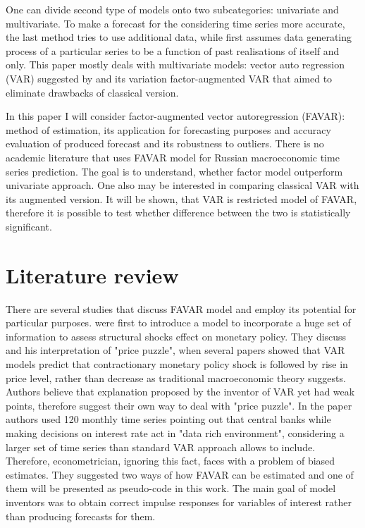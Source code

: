\documentclass[a4paper, 14pt]{article}
\begin{document}
One can divide second type of models onto two subcategories: univariate and multivariate. To make a forecast for the considering time series more accurate, the last method tries to use additional data, while first assumes data generating process of a particular series to be a function of past realisations of itself and only. This paper mostly deals with multivariate models: vector auto regression (VAR) suggested by \cite{sims1980martingale} and its variation factor-augmented VAR that aimed to eliminate drawbacks of classical version.  

In this paper I will consider factor-augmented vector autoregression (FAVAR): method of estimation, its application for forecasting purposes and accuracy evaluation of produced forecast and its robustness to outliers. There is no academic literature that uses FAVAR model for Russian macroeconomic time series prediction. The goal is to understand, whether factor model outperform univariate approach. One also may be interested in comparing classical VAR with its augmented version. It will be shown, that VAR is restricted model of FAVAR, therefore it is possible to test whether difference between the two is statistically significant. 
 
\section*{Literature review}
There are several studies that discuss FAVAR model and employ its potential for particular purposes. \cite{bernanke2005measuring} were first to introduce a model to incorporate a huge set of information to assess structural shocks effect on monetary policy. They discuss \cite{sims1992interpreting} and his interpretation of "price puzzle", when several papers showed that VAR models predict that contractionary monetary policy shock is followed by rise in price level, rather than decrease as traditional macroeconomic theory suggests. Authors believe that explanation proposed by the inventor of VAR yet had weak points, therefore suggest their own way to deal with "price puzzle". In the paper authors used 120 monthly time series pointing out that central banks while making decisions on interest rate act in "data rich environment", considering a larger set of time series than standard VAR approach allows to include. Therefore, econometrician, ignoring this fact, faces with a problem of biased estimates. They suggested two ways of how FAVAR can be estimated and one of them will be presented as pseudo-code in this work. The main goal of model inventors was to obtain correct impulse responses for variables of interest rather than producing forecasts for them. 
\end{document}
